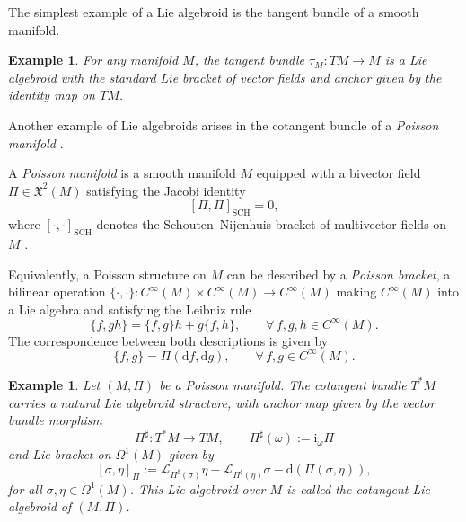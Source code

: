 \documentclass[12pt,letterpaper]{article}
\newtheorem{example}[theorem]{Example}
\numberwithin{equation}{section}
\begin{document}
The simplest example of a Lie algebroid is the tangent bundle of a smooth manifold.

\begin{example}\label{tant-algebroid}
For any manifold $M$, the tangent bundle $\tau_M: TM \rightarrow M $ is a Lie algebroid with the standard Lie bracket of vector fields and anchor given by the identity map on $TM$.
\end{example}

Another example of Lie algebroids arises in the cotangent bundle of a \emph{Poisson manifold} \cite{coste-dazord-weinstein-1987}.

A \emph{Poisson manifold} is a smooth manifold $M$ equipped with a bivector field 
$\Pi \in \mathfrak{X}^2(M)$ satisfying the Jacobi identity
$$[\Pi,\Pi]_{\mathrm{SCH}} = 0,$$
where $[\cdot,\cdot]_{\mathrm{SCH}}$ denotes the Schouten--Nijenhuis bracket of multivector 
fields on $M$ \cite{lichnerowicz-1977}.

Equivalently, a Poisson structure on $M$ can be described by a \emph{Poisson bracket}, 
a bilinear operation $\{\cdot,\cdot\}: C^\infty(M)\times C^\infty(M)\rightarrow C^\infty(M)$ 
making $C^\infty(M)$ into a Lie algebra and satisfying the Leibniz rule
$$\{f,gh\} = \{f,g\}h + g\{f,h\}, \qquad \forall\, f,g,h\in C^\infty(M).$$
The correspondence between both descriptions is given by
$$\{f,g\} = \Pi(\mathrm{d}f,\mathrm{d}g), \qquad \forall\, f,g\in C^\infty(M).$$


\begin{example}\label{Poiss-algebroid}
Let $(M,\Pi)$ be a Poisson manifold. The cotangent bundle $T^*M$ carries a natural 
Lie algebroid structure, with anchor map given by the vector bundle morphism
$$\Pi^\sharp: T^*M \rightarrow TM, \qquad \Pi^\sharp(\omega) := \mathrm{i}_\omega \Pi$$ 
and Lie bracket on $\Omega^1(M)$ given by
$$[\sigma,\eta]_\Pi := \mathcal{L}_{\Pi^\sharp(\sigma)}\eta 
   - \mathcal{L}_{\Pi^\sharp(\eta)}\sigma - \mathrm{d}(\Pi(\sigma,\eta)),$$
for all $\sigma,\eta\in\Omega^1(M)$. This Lie algebroid over $M$ is called the 
\emph{cotangent Lie algebroid} of $(M,\Pi)$.
\end{example}

\end{document}
